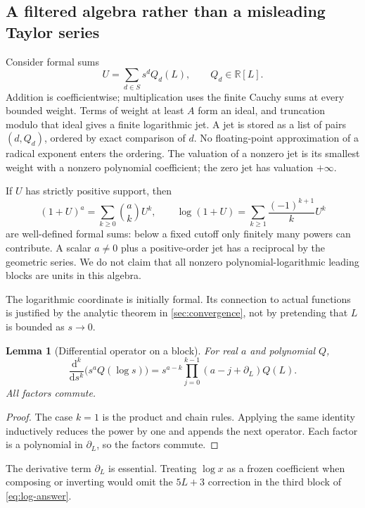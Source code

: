 \documentclass[11pt,a4paper]{article}
\numberwithin{equation}{section}
\newtheorem{lemma}[theorem]{Lemma}
\theoremstyle{definition}
\newcommand{\R}{\mathbb R}
\newcommand{\dd}{\mathrm d}
\newcommand{\DL}{\partial_L}
\begin{document}
\subsection{A filtered algebra rather than a misleading Taylor series}
Consider formal sums
\begin{equation}\label{eq:algebra}
 U=\sum_{d\in S}s^d Q_d(L),\qquad Q_d\in\R[L].
\end{equation}
Addition is coefficientwise; multiplication uses the finite Cauchy sums
at every bounded weight. Terms of weight at least $A$ form an ideal, and
truncation modulo that ideal gives a finite logarithmic jet. A jet is
stored as a list of pairs $(d,Q_d)$, ordered by exact comparison of $d$.
No floating-point approximation of a radical exponent enters the ordering.
The valuation of a nonzero jet is its smallest weight with a nonzero
polynomial coefficient; the zero jet has valuation $+\infty$.

If $U$ has strictly positive support, then
\[
 (1+U)^a=\sum_{k\ge0}\binom ak U^k,
 \qquad
 \log(1+U)=\sum_{k\ge1}\frac{(-1)^{k+1}}k U^k
\]
are well-defined formal sums: below a fixed cutoff only finitely many
powers can contribute. A scalar $a\ne0$ plus a positive-order jet has a
reciprocal by the geometric series. We do not claim that all nonzero
polynomial-logarithmic leading blocks are units in this algebra.

The logarithmic coordinate is initially formal. Its connection to actual
functions is justified by the analytic theorem in \cref{sec:convergence},
not by pretending that $L$ is bounded as $s\to0$.

\begin{lemma}[Differential operator on a block]\label{lem:operator}
For real $a$ and polynomial $Q$,
\begin{equation}\label{eq:operator}
 \frac{\dd^k}{\dd s^k}\bigl(s^aQ(\log s)\bigr)
 =s^{a-k}\prod_{j=0}^{k-1}(a-j+\DL)Q(L).
\end{equation}
All factors commute.
\end{lemma}
\begin{proof}
The case $k=1$ is the product and chain rules. Applying the same identity
inductively reduces the power by one and appends the next operator.
Each factor is a polynomial in $\DL$, so the factors commute.
\end{proof}

The derivative term $\DL$ is essential. Treating $\log x$ as a frozen
coefficient when composing or inverting would omit the $5L+3$ correction
in the third block of \eqref{eq:log-answer}.
\end{document}
